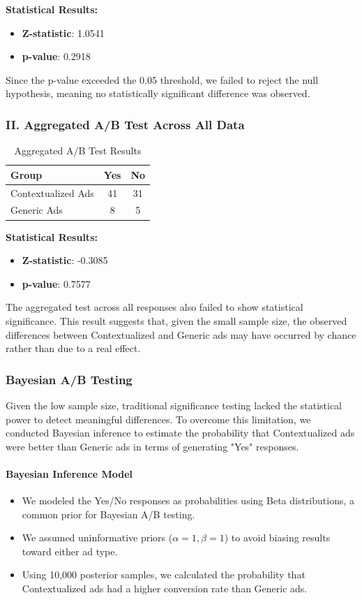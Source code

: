 \documentclass[a4paper,11pt]{article}
\begin{document}
\noindent \textbf{Statistical Results:}
\begin{itemize}
    \item \textbf{Z-statistic}: 1.0541
    \item \textbf{p-value}: 0.2918
\end{itemize}
Since the p-value exceeded the 0.05 threshold, we failed to reject the null hypothesis, meaning no statistically significant difference was observed.

\subsubsection*{II. Aggregated A/B Test Across All Data} 
\begin{table}[H]
\centering
\begin{tabular}{|l|c|c|}
    \hline
    \textbf{Group} & \textbf{Yes} & \textbf{No} \\ \hline
    Contextualized Ads & 41 & 31 \\ \hline
    Generic Ads & 8 & 5 \\ \hline
\end{tabular}
\caption{Aggregated A/B Test Results}
\end{table}

\noindent \textbf{Statistical Results:}
\begin{itemize}
    \item \textbf{Z-statistic}: -0.3085
    \item \textbf{p-value}: 0.7577
\end{itemize}
The aggregated test across all responses also failed to show statistical significance. This result suggests that, given the small sample size, the observed differences between Contextualized and Generic ads may have occurred by chance rather than due to a real effect.

\subsubsection{Bayesian A/B Testing}
Given the low sample size, traditional significance testing lacked the statistical power to detect meaningful differences. To overcome this limitation, we conducted Bayesian inference to estimate the probability that Contextualized ads were better than Generic ads in terms of generating "Yes" responses.

\paragraph{Bayesian Inference Model}
\begin{itemize}
    \item We modeled the Yes/No responses as probabilities using Beta distributions, a common prior for Bayesian A/B testing.
    \item We assumed uninformative priors (\(\alpha = 1, \beta = 1\)) to avoid biasing results toward either ad type.
    \item Using 10,000 posterior samples, we calculated the probability that Contextualized ads had a higher conversion rate than Generic ads.
\end{itemize}
\end{document}

